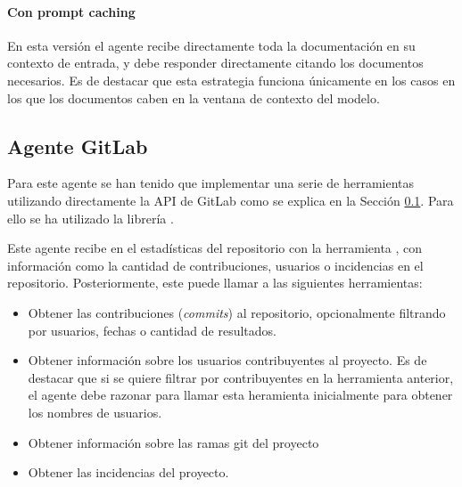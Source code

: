 \paragraph{Con prompt caching}
En esta versión el agente recibe directamente toda la documentación en su contexto de entrada, y debe responder directamente citando los documentos necesarios. Es de destacar que esta estrategia funciona únicamente en los casos en los que los documentos caben en la ventana de contexto del modelo.

\subsection{Agente GitLab}
Para este agente se han tenido que implementar una serie de herramientas utilizando directamente la API de GitLab como se explica en la Sección \ref{}. Para ello se ha utilizado la librería .

Este agente recibe en el  estadísticas del repositorio con la herramienta , con información como la cantidad de contribuciones, usuarios o incidencias en el repositorio. Posteriormente, este puede llamar a las siguientes herramientas:
\begin{itemize}
  \item{} Obtener las contribuciones (\textit{commits}) al repositorio, opcionalmente filtrando por usuarios, fechas o cantidad de resultados.
  \item{}Obtener información sobre los usuarios contribuyentes al proyecto. Es de destacar que si se quiere filtrar por contribuyentes en la herramienta anterior, el agente debe razonar para llamar esta heramienta inicialmente para obtener los nombres de usuarios.
  \item{}Obtener información sobre las ramas git del proyecto
  \item{}Obtener las incidencias del proyecto.
\end{itemize}



















